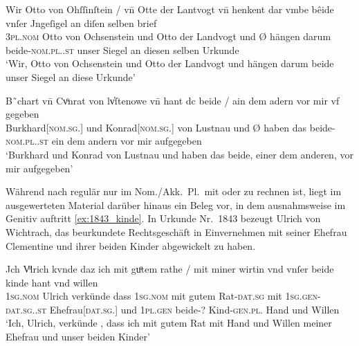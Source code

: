 \begin{exe}
\ex \label{ex:vvfinctrl2}
	\begin{xlist}
	\ex \label{ex:vvfinctrl2_1}
		\gll Wir Otto von Ohſſinſtein / vn̄ Otte der Lantvogt \textelp{} vn̄ {}
				henkent {dar vmbe} bêide vnſer Jngeſigel an diſen selben
				brief \\
			\textsc{3pl\subM.nom} Otto von Ochsenstein {} und Otto der Landvogt
				{} und Ø\subM{} hängen darum beide-\textsc{nom.pl.\MascM.st}
				unser Siegel an diesen selben Urkunde \\
		\trans `Wir, Otto von Ochsenstein und Otto der Landvogt \textelp{}
			und  hängen darum beide unser Siegel an diese Urkunde'
			\parencites(Nr.~1145, Burg Ochsenstein, Dépt.~Bas-Rhin, 1289)[427,5--6]{cao2}

	\ex \label{ex:vvfinctrl2_2}
		\gll B˜chart vn̄ Cvͦnrat von lv̓ſtenowe \textelp{} vn̄ {} hant dc beide
				/ ain dem adern vor mir {vf gegeben} \\
			Burkhard[\textsc{nom.sg.\MascM}] und Konrad[\textsc{nom.sg.\MascM}]
				von Lustnau {} und Ø\subM{} haben das
				beide-\textsc{nom.pl.\MascM.st} {} ein dem andern vor mir
				aufgegeben \\
		\trans `Burkhard und Konrad von Lustnau \textelp{} und
			 haben das beide, einer dem anderen, vor mir
			aufgegeben'
			\parencites(Nr.~2607, Tübingen, 1297)[32,41--33,1]{cao4}
	\end{xlist}
\end{exe}

\label{phsec:beidegen}
Während nach \citet[623]{ksw2} regulär nur im Nom./Akk.~Pl.\ mit 
oder  zu rechnen ist, liegt im ausgewerteten Material darüber
hinaus ein Beleg vor, in dem  ausnahmsweise im Genitiv auftritt
\cref{ex:1843_kinde}. In Urkunde Nr.~1843 \autocite[146,11--47]{cao3} bezeugt
Ulrich von Wichtrach, das beurkundete Rechtsgeschäft in Einvernehmen mit seiner
Ehefrau Clementine und ihrer beiden Kinder abgewickelt zu haben.

\begin{exe}
\ex\label{ex:1843_kinde}
	\gll Jch Vͦlrich \textelp{} kvnde \textelp{} daz ich mit guͦtem rathe
			/ mit miner wirtin \textelp{} vnd vnſer beide kinde hant
			vnd willen \\
		\textsc{1sg\subM.nom} Ulrich {} verkünde {} dass \textsc{1sg\subM.nom} mit gutem
			Rat-\textsc{dat.sg} {} mit \textsc{1sg\subM.gen-dat.sg.\FemF.st}
			Ehefrau[\textsc{dat.sg.\FemF}] {} und \textsc{1pl\subMF.gen} beide-?
			Kind-\textsc{gen.pl.\NeutA} Hand und Willen \\
	\trans `Ich, Ulrich, \textelp{} verkünde \textelp{}, dass ich mit
		gutem Rat  mit Hand und Willen meiner Ehefrau \textelp{}
		und unser beiden Kinder'
		\parencites(Nr.~1843, Thun, Kt.~Bern, 1293)[146,11--13]{cao3}
\end{exe}

